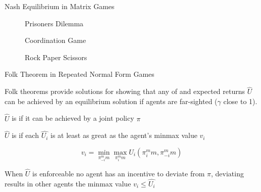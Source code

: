 \begin{frame}{Nash Equilibrium in Matrix Games}


    \begin{figure}[ht]
        \centering
        \begin{minipage}[bt]{0.32\textwidth}
            \centering
            \gamepd
            \caption{Prisoners Dilemma}
        \end{minipage}\hfill
        \begin{minipage}[bt]{0.32\textwidth}
            \centering
            \gamecoord
            \caption{Coordination Game}
        \end{minipage}\hfill
        \begin{minipage}[bt]{0.32\textwidth}
            \centering
            \gamerps
            \caption{Rock Paper Scissors}
        \end{minipage}
    \end{figure}
    
    

\end{frame}

\begin{frame}{Folk Theorem in Repeated Normal Form Games}

    Folk theorems provide solutions for  showing that any  of  and  expected returns \(\hat{U}\) can be achieved by an equilibrium solution if agents are far-sighted (\(\gamma\) close to 1).

    \blist
        \item \(\hat{U}\) is  if it can be achieved by a joint policy \(\pi\)
        \item \(\hat{U}\) is  if each \(\hat{U_i}\) is at least as great as the agent's minmax value \(v_i\)
    \elist
    \vspace{0pt}
    
    \begin{equation*}
        v_i = \min_{\pi_{-i}^mm}\max_{\pi_{i}^mm}U_i(\pi_{i}^mm, \pi_{-i}^mm)
    \end{equation*}

    \blist
        \item When \(\hat{U}\) is enforceable no agent has an incentive to deviate from \(\pi\), deviating results in other agents  the minmax value \(v_i \leq \hat{U_i}\)
    \elist

\end{frame}

